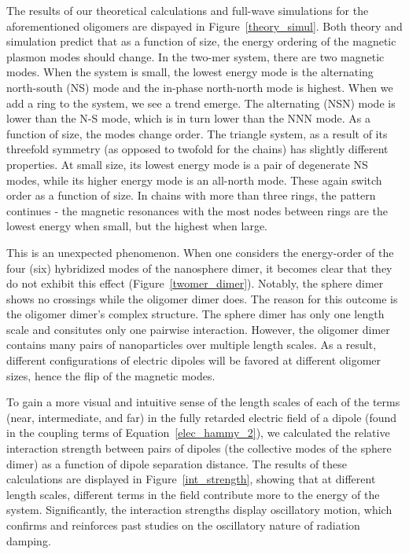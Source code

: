 \documentclass[journal=apchd5,manuscript=article]{achemso}
\begin{document}
The results of our theoretical calculations and full-wave simulations for the aforementioned oligomers are dispayed in Figure~\ref{theory_simul}. Both theory and simulation predict that as a function of size, the energy ordering of the magnetic plasmon modes should change. In the two-mer system, there are two magnetic modes. When the system is small, the lowest energy mode is the alternating north-south (NS) mode and the in-phase north-north mode is highest. When we add a ring to the system, we see a trend emerge. The alternating (NSN) mode is lower than the N-S mode, which is in turn lower than the NNN mode. As a function of size, the modes change order. The triangle system, as a result of its threefold symmetry (as opposed to twofold for the chains) has slightly different properties. At small size, its lowest energy mode is a pair of degenerate NS modes, while its higher energy mode is an all-north mode. These again switch order as a function of size. In chains with more than three rings, the pattern continues - the magnetic resonances with the most nodes between rings are the lowest energy when small, but the highest when large.

This is an unexpected phenomenon. When one considers the energy-order of the four (six) hybridized modes of the nanosphere dimer, it becomes clear that they do not exhibit this effect (Figure~\ref{twomer_dimer}). Notably, the sphere dimer shows no crossings while the oligomer dimer does. The reason for this outcome is the oligomer dimer's complex structure\cite{Cherqui2016}. The sphere dimer has only one length scale and consitutes only one pairwise interaction. However, the oligomer dimer contains many pairs of nanoparticles over multiple length scales. As a result, different configurations of electric dipoles will be favored at different oligomer sizes, hence the flip of the magnetic modes.

To gain a more visual and intuitive sense of the length scales of each of the terms (near, intermediate, and far) in the fully retarded electric field of a dipole (found in the coupling terms of Equation~\ref{elec_hammy_2}), we calculated the relative interaction strength between pairs of dipoles (the collective modes of the sphere dimer) as a function of dipole separation distance. The results of these calculations are displayed in Figure~\ref{int_strength}, showing that at different length scales, different terms in the field contribute more to the energy of the system. Significantly, the interaction strengths display oscillatory motion, which confirms and reinforces past studies on the oscillatory nature of radiation damping.\cite{vonPlessen2007}
\end{document}

